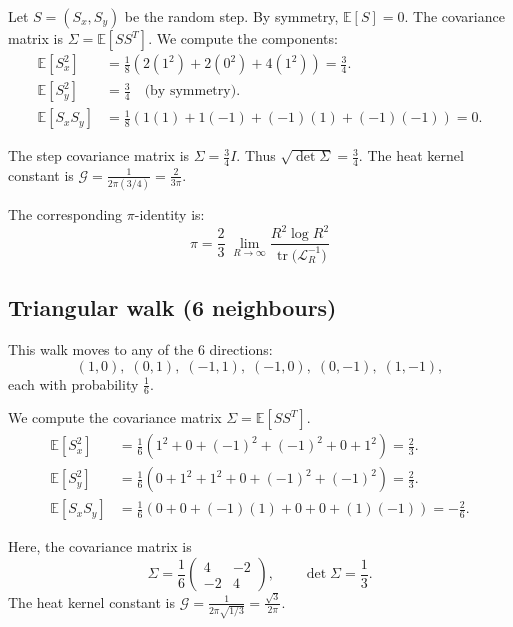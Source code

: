 \documentclass{article}
\numberwithin{equation}{section}
\theoremstyle{definition}
\theoremstyle{remark}
\newcommand{\cG}{\mathcal{G}}
\DeclareMathOperator{\tr}{tr}
\newcommand{\E}{\mathbb{E}}
\begin{document}
Let $S=(S_x, S_y)$ be the random step. By symmetry, $\E[S]=0$. The covariance matrix is $\Sigma = \E[S S^T]$. We compute the components:
\begin{align*}
\E[S_x^2] &= \frac{1}{8} \left( 2(1^2) + 2(0^2) + 4(1^2) \right) = \frac{3}{4}. \\
\E[S_y^2] &= \frac{3}{4} \quad \text{(by symmetry)}. \\
\E[S_x S_y] &= \frac{1}{8} \left( 1(1) + 1(-1) + (-1)(1) + (-1)(-1) \right) = 0.
\end{align*}

The step covariance matrix is $\Sigma = \tfrac{3}{4} I$. Thus $\sqrt{\det\Sigma} = \frac{3}{4}$.
The heat kernel constant is \( \cG = \frac{1}{2\pi (3/4)} = \frac{2}{3\pi} \).

The corresponding $\pi$-identity is:
\begin{equation}\label{eq:King_pi}
\boxed{\;\displaystyle \pi=\frac{2}{3}\;\lim_{R\to\infty}\frac{R^{2}\log R^{2}}{\tr\!\bigl(\mathcal{L}_R^{-1}\bigr)}\;}
\end{equation}

\subsection{Triangular walk (6 neighbours)}\label{app:tri}

This walk moves to any of the 6 directions:
\[
(1,0),\;(0,1),\;(-1,1),\;(-1,0),\;(0,-1),\;(1,-1),
\]
each with probability \( \tfrac16 \).

We compute the covariance matrix $\Sigma = \E[S S^T]$.
\begin{align*}
\E[S_x^2] &= \frac{1}{6} (1^2 + 0 + (-1)^2 + (-1)^2 + 0 + 1^2) = \frac{2}{3}. \\
\E[S_y^2] &= \frac{1}{6} (0 + 1^2 + 1^2 + 0 + (-1)^2 + (-1)^2) = \frac{2}{3}. \\
\E[S_x S_y] &= \frac{1}{6} (0 + 0 + (-1)(1) + 0 + 0 + (1)(-1)) = -\frac{2}{6}.
\end{align*}

Here, the covariance matrix is
\[
\Sigma
=\frac{1}{6}
\begin{pmatrix}
4 & -2 \\
-2 & 4
\end{pmatrix},
\qquad
\det\Sigma = \frac{1}{3}.
\]
The heat kernel constant is $\cG = \frac{1}{2\pi\sqrt{1/3}} = \frac{\sqrt{3}}{2\pi}$.
\end{document}
